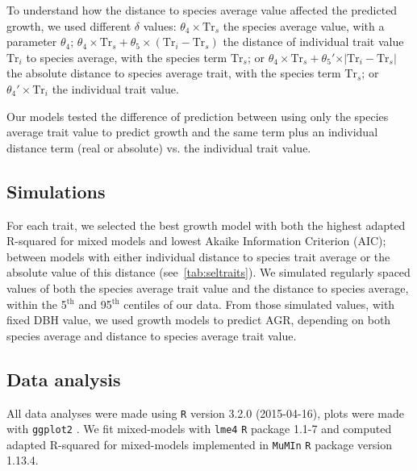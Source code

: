 To understand how the distance to species average value affected the predicted growth, we used different $\delta$ values: $\theta_4 \times \text{Tr}_s$ the species average value, with a parameter $\theta_4$; $\theta_4 \times \text{Tr}_s + \theta_5 \times(\text{Tr}_i - \text{Tr}_s)$ the distance of individual trait value $\text{Tr}_i$ to species average, with the species term $\text{Tr}_s$; or $\theta_4 \times \text{Tr}_s + \theta_5' \times \vert \text{Tr}_i - \text{Tr}_s \vert$ the absolute distance to species average trait, with the species term $\text{Tr}_s$; or $\theta_4' \times \text{Tr}_i$ the individual trait value.

Our models tested the difference of prediction between using only the species average trait value to predict growth and the same term plus an individual distance term (real or absolute) vs. the individual trait value.

\subsection*{Simulations}

For each trait, we selected the best growth model with both the highest adapted R-squared for mixed models \citep{nakagawa_general_2013} and lowest Akaike Information Criterion (AIC); between models with either individual distance to species trait average or the absolute value of this distance (see~\autoref{tab:seltraits}). We simulated regularly spaced values of both the species average trait value and the distance to species average, within the 5$^{\text{th}}$ and 95$^{\text{th}}$ centiles of our data. From those simulated values, with fixed DBH value, we used growth models to predict AGR, depending on both species average and distance to species average trait value.

\subsection*{Data analysis}

All data analyses were made using \texttt{R} \citep{R_language} version 3.2.0 (2015-04-16), plots were made with \texttt{ggplot2} \citep{ggplot2_pkg}. We fit mixed-models with \texttt{lme4} \texttt{R} package \citep{lme4_pkg} 1.1-7 and computed adapted R-squared for mixed-models \citep{nakagawa_general_2013} implemented in \texttt{MuMIn} \texttt{R} package \citep{mumin_pkg} version 1.13.4.

